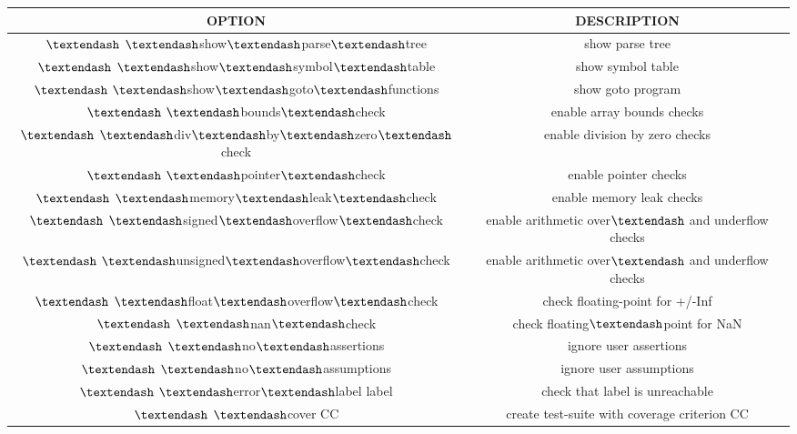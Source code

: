  \begin{center}

\begin{tabular}{|| c | c ||}

\hline

OPTION & DESCRIPTION  \\ [0.5ex]

\hline
\hline
$\textendash$ $\textendash$show$\textendash$parse$\textendash$tree     &       show parse tree \\
\hline
$\textendash$ $\textendash$show$\textendash$symbol$\textendash$table    &      show symbol table \\
\hline
$\textendash$ $\textendash$show$\textendash$goto$\textendash$functions   &     show goto program \\
\hline
$\textendash$ $\textendash$bounds$\textendash$check    &           enable array bounds checks \\
\hline
$\textendash$ $\textendash$div$\textendash$by$\textendash$zero$\textendash$check     &     enable division by zero checks \\
\hline
$\textendash$ $\textendash$pointer$\textendash$check         &     enable pointer checks \\  
\hline
$\textendash$ $\textendash$memory$\textendash$leak$\textendash$check      &    enable memory leak checks \\
\hline\hline
$\textendash$ $\textendash$signed$\textendash$overflow$\textendash$check   &   enable arithmetic over$\textendash$ and underflow checks \\
\hline
$\textendash$ $\textendash$unsigned$\textendash$overflow$\textendash$check  &  enable arithmetic over$\textendash$ and underflow checks \\
\hline
$\textendash$ $\textendash$float$\textendash$overflow$\textendash$check      & check floating-point for +/-Inf \\
\hline
$\textendash$ $\textendash$nan$\textendash$check               &   check floating$\textendash$point for NaN \\
\hline
$\textendash$ $\textendash$no$\textendash$assertions           &   ignore user assertions \\
\hline
$\textendash$ $\textendash$no$\textendash$assumptions          &   ignore user assumptions \\
\hline
$\textendash$ $\textendash$error$\textendash$label label       &   check that label is unreachable \\
\hline
$\textendash$ $\textendash$cover CC                &   create test-suite with coverage criterion CC \\

\end{tabular}
\end{center}

